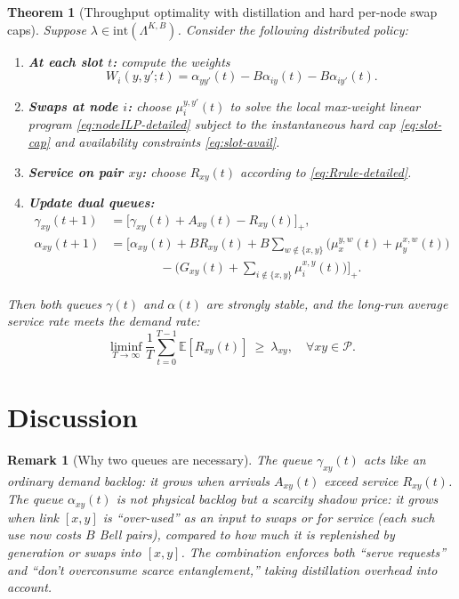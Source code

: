 \documentclass[11pt]{article}
\newtheorem{theorem}{Theorem}
\newtheorem{remark}{Remark}
\newcommand{\E}{\mathbb{E}}
\newcommand{\Pairs}{\mathcal{P}} %
\begin{document}
\begin{theorem}[Throughput optimality with distillation and hard per-node swap caps]
\label{thm:main}
Suppose $\lambda\in\mathrm{int}(\Lambda^{K,B})$. Consider the following distributed policy:

\begin{enumerate}[leftmargin=2em,label=(\roman*)]
\item \textbf{At each slot $t$:} compute the weights
\[
W_i(y,y';t)=\alpha_{yy'}(t)-B\alpha_{iy}(t)-B\alpha_{iy'}(t).
\]

\item \textbf{Swaps at node $i$:} choose $\mu_i^{y,y'}(t)$ to solve the local max-weight linear program \eqref{eq:nodeILP-detailed} subject to the instantaneous hard cap \eqref{eq:slot-cap} and availability constraints \eqref{eq:slot-avail}.

\item \textbf{Service on pair $xy$:} choose $R_{xy}(t)$ according to \eqref{eq:Rrule-detailed}.

\item \textbf{Update dual queues:}
\begin{align*}
\gamma_{xy}(t{+}1)
&=\big[\gamma_{xy}(t)+A_{xy}(t)-R_{xy}(t)\big]_+,\\
\alpha_{xy}(t{+}1)
&=\Big[\alpha_{xy}(t)
+ B R_{xy}(t)
+ B\sum_{w\notin\{x,y\}}\big(\mu_x^{y,w}(t)+\mu_y^{x,w}(t)\big)\\
&\qquad\qquad
- \Big(G_{xy}(t)+\sum_{i\notin\{x,y\}}\mu_i^{x,y}(t)\Big)
\Big]_+.
\end{align*}
\end{enumerate}

Then both queues $\gamma(t)$ and $\alpha(t)$ are strongly stable, and the long-run average service rate meets the demand rate:
\[
\liminf_{T\to\infty}
\frac1T \sum_{t=0}^{T-1}\E[R_{xy}(t)]
\ \ge\ \lambda_{xy},
\quad \forall xy\in\Pairs.
\]
\end{theorem}

\section*{Discussion}

\begin{remark}[Why two queues are necessary]
The queue $\gamma_{xy}(t)$ acts like an ordinary demand backlog: it grows when arrivals $A_{xy}(t)$ exceed service $R_{xy}(t)$. The queue $\alpha_{xy}(t)$ is \emph{not} physical backlog but a scarcity shadow price: it grows when link $[x,y]$ is ``over-used'' as an input to swaps or for service (each such use now costs $B$ Bell pairs), compared to how much it is replenished by generation or swaps \emph{into} $[x,y]$. The combination enforces both ``serve requests'' and ``don't overconsume scarce entanglement,'' taking distillation overhead into account.
\end{remark}
\end{document}

